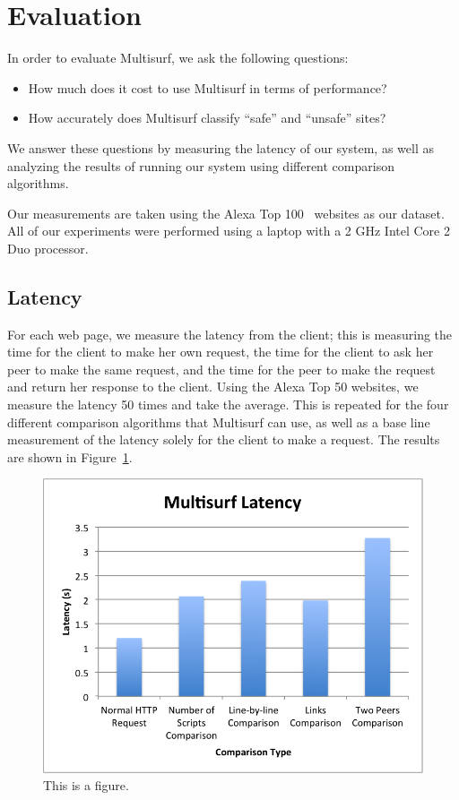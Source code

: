 \section{Evaluation}
\label{sec:eval}

In order to evaluate Multisurf, we ask the following questions:

\begin{itemize}
\item How much does it cost to use Multisurf in terms of performance?
\item How accurately does Multisurf classify ``safe'' and ``unsafe'' sites?
\end{itemize}

We answer these questions by measuring the latency of our system, as well as analyzing the results of running our system using different comparison algorithms.

Our measurements are taken using the Alexa Top 100~\cite{alexa} websites as our dataset.  All of our experiments were performed using a laptop with a 2 GHz Intel Core 2 Duo processor.  

\subsection{Latency} 
For each web page, we measure the latency from the client; this is measuring the time for the client to make her own request, the time for the client to ask her peer to make the same request, and the time for the peer to make the request and return her response to the client.  Using the Alexa Top 50 websites, we measure the latency 50 times and take the average.  This is repeated for the four different comparison algorithms that Multisurf can use, as well as a base line measurement of the latency solely for the client to make a request.  The results are shown in Figure~\ref{fig:latency}.

\begin{figure}[htb]
\label{fig:latency}
\begin{center}
\includegraphics[width=\linewidth]{latency}
\caption{This is a figure.}
\end{center}
\end{figure}

